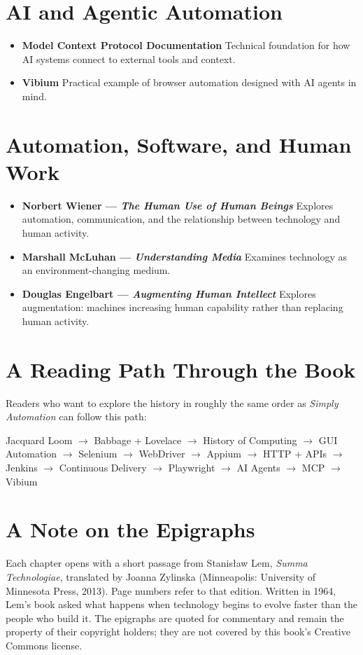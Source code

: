 \documentclass[11pt,twoside]{book}
\begin{document}
\section*{AI and Agentic Automation}
\begin{itemize}[nosep]
    \item \textbf{Model Context Protocol Documentation} Technical foundation for how AI systems connect to external tools and context.
    \item \textbf{Vibium} Practical example of browser automation designed with AI agents in mind.
\end{itemize}

\section*{Automation, Software, and Human Work}
\begin{itemize}[nosep]
    \item \textbf{Norbert Wiener — \textit{The Human Use of Human Beings}} Explores automation, communication, and the relationship between technology and human activity.
    \item \textbf{Marshall McLuhan — \textit{Understanding Media}} Examines technology as an environment-changing medium.
    \item \textbf{Douglas Engelbart — \textit{Augmenting Human Intellect}} Explores augmentation: machines increasing human capability rather than replacing human activity.
\end{itemize}

\section*{A Reading Path Through the Book}
Readers who want to explore the history in roughly the same order as \textit{Simply Automation} can follow this path:
\begin{center}
Jacquard Loom $\rightarrow$ Babbage + Lovelace $\rightarrow$ History of Computing $\rightarrow$ GUI Automation $\rightarrow$ Selenium $\rightarrow$ WebDriver $\rightarrow$ Appium $\rightarrow$ HTTP + APIs $\rightarrow$ Jenkins $\rightarrow$ Continuous Delivery $\rightarrow$ Playwright $\rightarrow$ AI Agents $\rightarrow$ MCP $\rightarrow$ Vibium
\end{center}

\section*{A Note on the Epigraphs}
Each chapter opens with a short passage from Stanisław Lem, \textit{Summa Technologiae}, translated by Joanna Zylinska (Minneapolis: University of Minnesota Press, 2013). Page numbers refer to that edition. Written in 1964, Lem's book asked what happens when technology begins to evolve faster than the people who build it. The epigraphs are quoted for commentary and remain the property of their copyright holders; they are not covered by this book's Creative Commons license.
\end{document}
